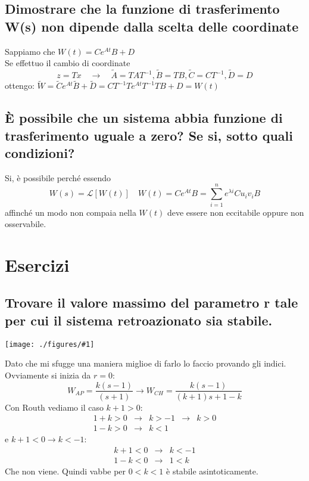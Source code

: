\documentclass{article}
\newcommand{\incfig}[2]{%
	\texttt{[image: ./figures/\#1]}%
}
\begin{document}
\subsection{Dimostrare che la funzione di trasferimento W(s) non dipende dalla scelta delle coordinate}
Sappiamo che $W(t) = Ce^{At}B+D$\\
Se effettuo il cambio di coordinate 
\[ z=Tx \quad \to \quad \widetilde{A}=TAT^{-1}, \widetilde{B}=TB, \widetilde{C}=CT^{-1}, \widetilde{D}=D\]
ottengo:
$\widetilde{W}=\widetilde{C}e^{At}\widetilde{B}+\widetilde{D}=CT^{-1}Te^{At}T^{-1}TB+D=W(t)$

\subsection{È possibile che un sistema abbia funzione di trasferimento uguale a zero? Se si, sotto
quali condizioni?}
Si, è possibile perché essendo 
\[ W(s)=\mathscr{L}[W(t)] \quad W(t)=Ce^{At}B=\sum_{i=1}^{n}e^{\lambda i}Cu_iv_iB \]
affinché un modo non compaia nella $W(t)$ deve essere non eccitabile oppure non osservabile.






\section{Esercizi}

\subsection{Trovare il valore massimo del parametro r tale per cui il sistema retroazionato sia stabile. }

\incfig{sistema.jpeg}{1.2}

Dato che mi sfugge una maniera miglioe di farlo lo faccio provando gli indici. Ovviamente si inizia da $r=0$:
\[ 
    W_{AP} = \frac{k(s-1)}{(s+1)} \to W_{CH} = \frac{k(s-1)}{(k+1)s+1-k}
\]
Con Routh vediamo il caso $k+1>0$:
\begin{align*}
    1+k >0 &\to& k>-1&\to& k >0\\
    1-k >0 &\to& k<1
\end{align*}
e $k+1 < 0\to k <-1$:
\begin{align*}
    k+1 <0 &\to& k < -1\\
    1-k <0 &\to& 1<k 
\end{align*} 
Che non viene.
Quindi vabbe per $0<k<1$ è stabile asintoticamente.
\end{document}
